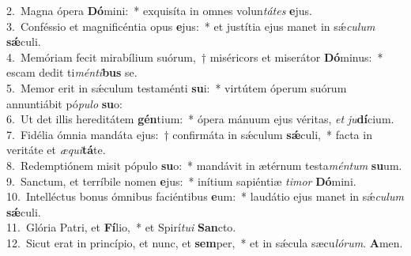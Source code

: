 {2.~}Magna ópera \textbf{Dó}mini:~* exquisíta in omnes volun\textit{tá}\textit{tes} \textbf{e}jus.\\
{3.~}Conféssio et magnificéntia opus \textbf{e}jus:~* et justítia ejus manet in sǽ\textit{cu}\textit{lum} \textbf{sǽ}culi.\\
{4.~}Memóriam fecit mirabílium suórum,~† miséricors et miserátor \textbf{Dó}minus:~* escam dedit ti\textit{mén}\textit{ti}\textbf{bus} se.\\
{5.~}Memor erit in sǽculum testaménti \textbf{su}i:~* virtútem óperum suórum annuntiábit pó\textit{pu}\textit{lo} \textbf{su}o:\\
{6.~}Ut det illis hereditátem \textbf{gén}tium:~* ópera mánuum ejus véritas, \textit{et} \textit{ju}\textbf{dí}cium.\\
{7.~}Fidélia ómnia mandáta ejus:~† confirmáta in sǽculum \textbf{sǽ}culi,~* facta in veritáte et \textit{æ}\textit{qui}\textbf{tá}te.\\
{8.~}Redemptiónem misit pópulo \textbf{su}o:~* mandávit in ætérnum testa\textit{mén}\textit{tum} \textbf{su}um.\\
{9.~}Sanctum, et terríbile nomen \textbf{e}jus:~* inítium sapiéntiæ \textit{ti}\textit{mor} \textbf{Dó}mini.\\
{10.~}Intelléctus bonus ómnibus faciéntibus \textbf{e}um:~* laudátio ejus manet in sǽ\textit{cu}\textit{lum} \textbf{sǽ}culi.\\
{11.~}Glória Patri, et \textbf{Fí}lio,~* et Spirí\textit{tu}\textit{i} \textbf{San}cto.\\
{12.~}Sicut erat in princípio, et nunc, et \textbf{sem}per,~* et in sǽcula sæcu\textit{ló}\textit{rum}. \textbf{A}men.\\
